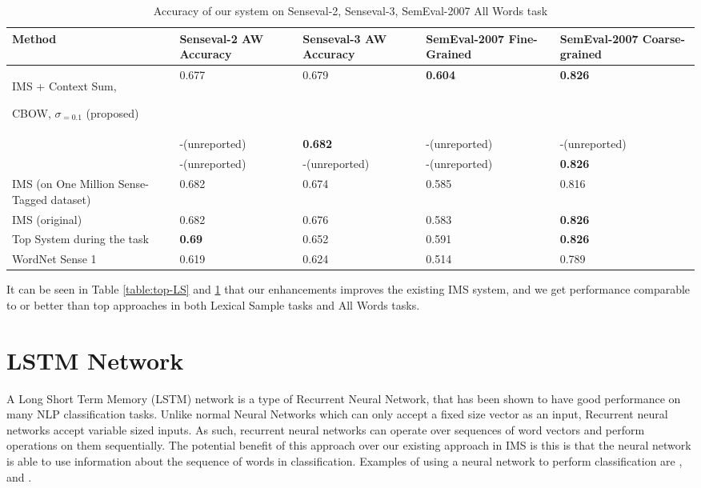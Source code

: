 \documentclass[11pt]{article}
\begin{document}
\begin{table}
	\caption{Accuracy of our system on Senseval-2, Senseval-3, SemEval-2007 All Words task}
	\label{table:All-AW}
	\begin{center}
		\begin{tabular}{| p{4cm} | p{2cm} | p{3cm} | p{3cm} | p{3cm} | }
			\hline
			Method & Senseval-2 AW Accuracy & Senseval-3 AW Accuracy & SemEval-2007 Fine-Grained & SemEval-2007 Coarse-grained \\
			\hline
			IMS + Context Sum, 
			
			CBOW, $\sigma _{=0.1}$ (proposed) & 0.677 & 0.679 & {\bf0.604} & {\bf 0.826 } \\
			\hline
			
			\cite{Taghipour15} & -(unreported) & {\bf0.682} & -(unreported) & -(unreported) \\
			\hline
			\cite{chen2014} & -(unreported) & -(unreported) & -(unreported) & {\bf 0.826 } \\
			\hline
			IMS (on One Million Sense-Tagged dataset) & 0.682 & 0.674 & 0.585 & 0.816 \\
			\hline
			IMS (original) & 0.682 & 0.676 & 0.583 & {\bf 0.826 }  \\
			\hline
			Top System during the task & {\bf0.69} & 0.652 & 0.591 & {\bf 0.826 } \\
			\hline
			WordNet Sense 1 & 0.619 & 0.624 & 0.514 & 0.789\\
			\hline
		\end{tabular}
	\end{center}
\end{table}


It can be seen in Table \ref{table:top-LS} and \ref{table:All-AW} that our enhancements improves the existing IMS system, and we get performance comparable to or better than top approaches in both Lexical Sample tasks and All Words tasks. 

\iffalse
\section{LSTM Network}

A Long Short Term Memory (LSTM) network is a type of Recurrent Neural Network, that has been shown to have good performance on many NLP classification tasks. Unlike normal Neural Networks which can only accept a fixed size vector as an input, Recurrent neural networks accept variable sized inputs. As such, recurrent neural networks can operate over sequences of word vectors and perform operations on them sequentially. The potential benefit of this approach over our existing approach in IMS is this is that the neural network is able to use information about the sequence of words in classification. Examples of using a neural network to perform classification are \cite{socher2011parsing}, and \cite{socher2013recursive}. 
\end{document}
